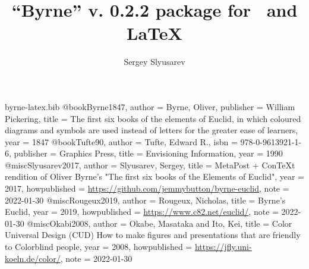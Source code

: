 \begin{filecontents}{byrne-latex.bib}
@book{Byrne1847,
  author = {Byrne, Oliver},
  publisher = {William Pickering},
  title = {The first six books of the elements of Euclid, in which coloured diagrams and symbols are used instead of letters for the greater ease of learners},
  year = 1847
}
@book{Tufte90,
  author = {Tufte, Edward R.},
  isbn = {978-0-9613921-1-6},
  publisher = {Graphics Press},
  title = {Envisioning Information},
  year = 1990
}
@misc{Slyusarev2017,
  author = {Slyusarev, Sergey},
  title = {MetaPost + ConTeXt rendition of Oliver Byrne's "The first six books of the Elements of Euclid"},
  year = {2017},
  howpublished = {\url{https://github.com/jemmybutton/byrne-euclid}},
  note = {2022-01-30}
}
@misc{Rougeux2019,
  author = {Rougeux, Nicholas},
  title = {Byrne’s Euclid},
  year = {2019},
  howpublished = {\url{https://www.c82.net/euclid/}},
  note = {2022-01-30}
}
@misc{Okabi2008,
  author = {Okabe, Masataka and Ito, Kei},
  title = {Color Universal Design (CUD) How to make figures and presentations that are friendly to Colorblind people},
  year = {2008},
  howpublished = {\url{https://jfly.uni-koeln.de/color/}},
  note = {2022-01-30}
}
\end{filecontents}

\documentclass{ltxdoc}
\usepackage{byrne}
\usepackage{ccicons,bxtexlogo,listings,hyperref}
\hypersetup{
     colorlinks=true,
     linkcolor=blue,
     filecolor=blue,
     citecolor = black,      
     urlcolor=cyan,
     }

\lstset{
language=MetaPost,
alsolanguage=TeX,
numbers=none,
basicstyle=\ttfamily\scriptsize
}

\def\mpPre{textLabels := true;}

\author{Sergey Slyusarev}
\title{``Byrne'' v. 0.2.2 package for \METAPOST\ and \LaTeX}


\maketitle

\begin{abstract}
This document describes ``Byrne'' package for \METAPOST\ and \LaTeX.
\end{abstract}

\begin{centering}

This document is distributed under CC-BY-SA 4.0 license 

\ccbysa 

\href{https://github.com/jemmybutton/byrne-latex}{https://github.com/jemmybutton/byrne-latex}

\end{centering}


